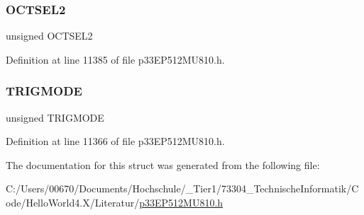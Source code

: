 \subsubsection{\texorpdfstring{O\+C\+T\+S\+E\+L2}{OCTSEL2}}
{\footnotesize\ttfamily unsigned O\+C\+T\+S\+E\+L2}



Definition at line 11385 of file p33\+E\+P512\+M\+U810.\+h.

\mbox{\label{structtag_o_c5_c_o_n1_b_i_t_s_a7a0057e0dca6e2663584b5b9e1da04c3}} 
\subsubsection{\texorpdfstring{T\+R\+I\+G\+M\+O\+DE}{TRIGMODE}}
{\footnotesize\ttfamily unsigned T\+R\+I\+G\+M\+O\+DE}



Definition at line 11366 of file p33\+E\+P512\+M\+U810.\+h.



The documentation for this struct was generated from the following file\+:\begin{DoxyCompactItemize}
\item 
C\+:/\+Users/00670/\+Documents/\+Hochschule/\+\_\+\+Tier1/73304\+\_\+\+Technische\+Informatik/\+Code/\+Hello\+World4.\+X/\+Literatur/\hyperlink{p33_e_p512_m_u810_8h}{p33\+E\+P512\+M\+U810.\+h}\end{DoxyCompactItemize}
